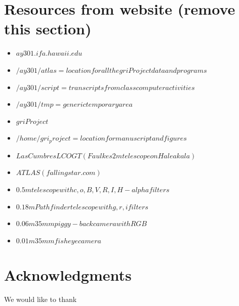 \documentclass[aps,prb,twocolumn,superscriptaddress]{revtex4-1}
\begin{document}
\section{Resources from website (remove this section)}
\begin{itemize}
	\item{} $ay301.ifa.hawaii.edu$
	\item{} $/ay301/atlas = location for all the gri Project data and programs$
	\item{} $/ay301/script = transcripts from class computer activities$
	\item{} $/ay301/tmp = generic temporary area$
	\item{} $gri Project$
	\item{} $/home/gri_project = location for manuscript and figures$
	\item{} $Las Cumbres LCOGT (Faulkes 2m telescope on Haleakala)$
	\item{} $ATLAS (fallingstar.com)$
	\item{} $0.5m telescope with c,o,B,V,R,I,H-alpha filters$
	\item{} $0.18m Pathfinder telescope with g,r,i filters$
	\item{} $0.06m 35mm piggy-back camera with RGB$
	\item{} $0.01m 35mm fisheye camera$
\end{itemize}



\section*{Acknowledgments}
We would like to thank   %





\setlength{\parindent}{0cm}




\end{document}
